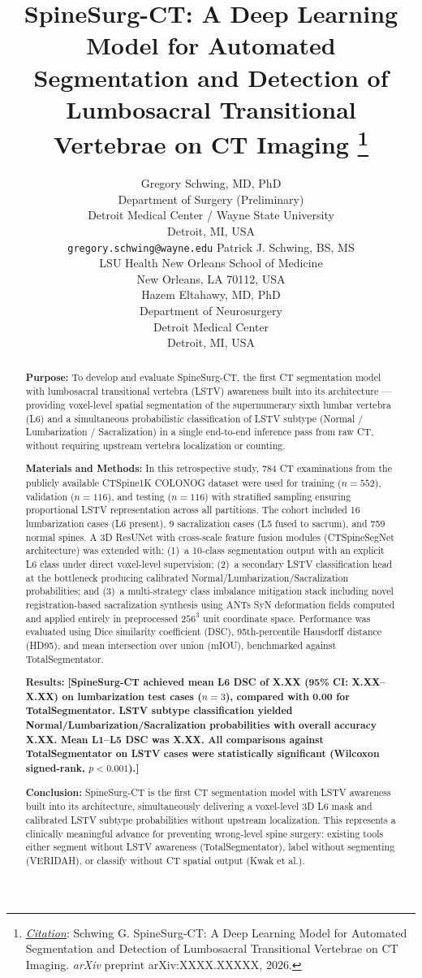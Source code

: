 \documentclass{article}
\title{SpineSurg-CT: A Deep Learning Model for Automated Segmentation
and Detection of Lumbosacral Transitional Vertebrae on CT Imaging%
\thanks{\textit{\underline{Citation}}: Schwing G.
SpineSurg-CT: A Deep Learning Model for Automated Segmentation and
Detection of Lumbosacral Transitional Vertebrae on CT Imaging.
\textit{arXiv} preprint arXiv:XXXX.XXXXX, 2026.}}
\author{
  Gregory Schwing, MD, PhD \\
  Department of Surgery (Preliminary) \\
  Detroit Medical Center / Wayne State University \\
  Detroit, MI, USA \\
  \texttt{gregory.schwing@wayne.edu}
  \And
  Patrick J. Schwing, BS, MS \\
  LSU Health New Orleans School of Medicine \\
  New Orleans, LA 70112, USA \\
  \And
  Hazem Eltahawy, MD, PhD \\
  Department of Neurosurgery \\
  Detroit Medical Center \\
  Detroit, MI, USA \\
}
\newcommand{\ph}[1]{\textcolor{placeholder}{\textbf{[#1]}}}
\begin{document}
\maketitle

\begin{abstract}
\noindent\textbf{Purpose:} To develop and evaluate SpineSurg-CT, the first
CT segmentation model with lumbosacral transitional vertebra (LSTV) awareness
built into its architecture --- providing voxel-level spatial segmentation of
the supernumerary sixth lumbar vertebra (L6) and a simultaneous probabilistic
classification of LSTV subtype (Normal / Lumbarization / Sacralization) in a
single end-to-end inference pass from raw CT, without requiring upstream
vertebra localization or counting.

\noindent\textbf{Materials and Methods:} In this retrospective study, 784 CT
examinations from the publicly available CTSpine1K COLONOG dataset were used
for training ($n{=}552$), validation ($n{=}116$), and testing ($n{=}116$) with
stratified sampling ensuring proportional LSTV representation across all
partitions. The cohort included 16 lumbarization cases (L6 present), 9
sacralization cases (L5 fused to sacrum), and 759 normal spines. A 3D ResUNet
with cross-scale feature fusion modules (CTSpineSegNet architecture) was
extended with: (1)~a 10-class segmentation output with an explicit L6 class
under direct voxel-level supervision; (2)~a secondary LSTV classification head
at the bottleneck producing calibrated Normal/Lumbarization/Sacralization
probabilities; and (3)~a multi-strategy class imbalance mitigation stack
including novel registration-based sacralization synthesis using ANTs SyN
deformation fields computed and applied entirely in preprocessed
$256^3$ unit coordinate space. Performance was evaluated using Dice similarity
coefficient (DSC), 95th-percentile Hausdorff distance (HD95), and mean
intersection over union (mIOU), benchmarked against TotalSegmentator.

\noindent\textbf{Results:} \ph{SpineSurg-CT achieved mean L6 DSC of X.XX
(95\% CI: X.XX--X.XX) on lumbarization test cases ($n{=}3$), compared with
0.00 for TotalSegmentator. LSTV subtype classification yielded
Normal/Lumbarization/Sacralization probabilities with overall accuracy X.XX.
Mean L1--L5 DSC was X.XX. All comparisons against TotalSegmentator on LSTV
cases were statistically significant (Wilcoxon signed-rank, $p < 0.001$).}

\noindent\textbf{Conclusion:} SpineSurg-CT is the first CT segmentation model
with LSTV awareness built into its architecture, simultaneously delivering a
voxel-level 3D L6 mask and calibrated LSTV subtype probabilities without
upstream localization. This represents a clinically meaningful advance for
preventing wrong-level spine surgery: existing tools either segment without
LSTV awareness (TotalSegmentator), label without segmenting (VERIDAH), or
classify without CT spatial output (Kwak et al.).
\end{abstract}
\end{document}
